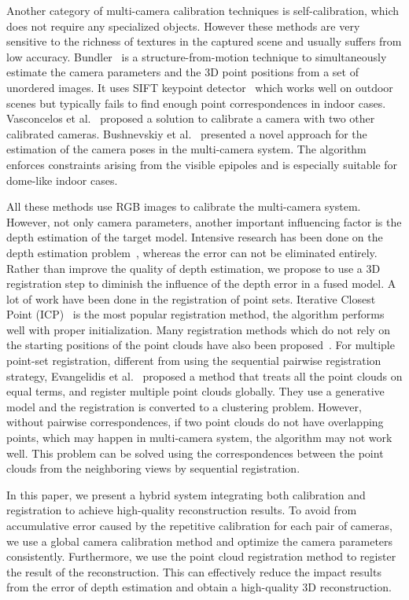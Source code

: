 Another category of multi-camera calibration techniques is self-calibration, which does not require any specialized objects.
However these methods are very sensitive to the richness of textures in the captured scene and usually suffers from low accuracy.
%
Bundler~\cite{snavely2006photo} is a structure-from-motion technique to simultaneously estimate the camera parameters and the 3D point positions from a set of unordered images.
%
It uses SIFT keypoint detector~\cite{lowe2004distinctive} which works well on outdoor scenes but typically fails to find enough point correspondences in indoor cases.
%
Vasconcelos et al.~\cite{vasconcelos2012minimal} proposed a solution to calibrate a camera with two other calibrated cameras.
Bushnevskiy et al.~\cite{bushnevskiy2016multicamera} presented a novel approach for the estimation of the camera poses in the multi-camera system.
The algorithm enforces constraints arising from the visible epipoles and is especially suitable for dome-like indoor cases.

All these methods use RGB images to calibrate the multi-camera system.
%
However, not only camera parameters, another important influencing factor is the depth estimation of the target model.
Intensive research has been done on the depth estimation problem~\cite{scharstein,Bleyer2011PatchMatch}, whereas the error can not be eliminated entirely.
%
Rather than improve the quality of depth estimation, we propose to use a 3D registration step to diminish the influence of the depth error in a fused model.
%
A lot of work have been done in the registration of point sets.
Iterative Closest Point (ICP)~\cite{Besl1992A} is the most popular registration method, the algorithm performs well with proper initialization.
%
Many registration methods which do not rely on the starting positions of the point clouds have also been proposed~\cite{Aiger:2008:CSR:1360612.1360684,5152473}.
%
For multiple point-set registration, different from using the sequential pairwise registration strategy, Evangelidis et al.~\cite{Evangelidis-ECCV-2014} proposed a method that treats all the point clouds on equal terms, and register multiple point clouds globally.
%
They use a generative model and the registration is converted to a clustering problem.
However, without pairwise correspondences, if two point clouds do not have overlapping points, which may happen in multi-camera system, the algorithm may not work well.
This problem can be solved using the correspondences between the point clouds from the neighboring views by sequential registration. 

In this paper, we present a hybrid system integrating both calibration and registration to achieve high-quality reconstruction results. To avoid from accumulative error caused by the repetitive calibration for each pair of cameras, we use a global camera calibration method and optimize the camera parameters consistently. Furthermore, we use the point cloud registration method to register the result of the reconstruction. This can effectively reduce the impact results from the error of depth estimation and obtain a high-quality 3D reconstruction.






